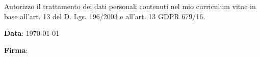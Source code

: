 \begin{cvparagraph}
    \begin{center}
        Autorizzo il trattamento dei dati personali contenuti nel mio curriculum vitae in base all’art. 13 del D. Lgs. 196/2003 e all’art. 13 GDPR 679/16.
    \end{center}
    
\end{cvparagraph}
\begin{cvparagraph}
\begin{minipage}{0.5\textwidth}
\textbf{Data}: \today
\end{minipage} 
\begin{minipage}{0.5\textwidth}
\textbf{Firma}:
\end{minipage}
\end{cvparagraph}